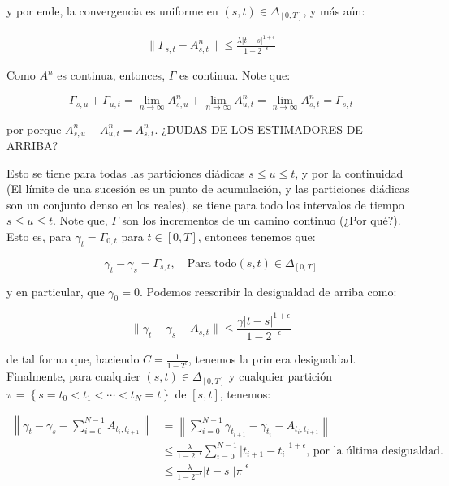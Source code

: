 y por ende, la convergencia es uniforme en $(s,t) \in \Delta_{[0,T]}$, y más aún:

\begin{align*}
	\lVert \Gamma_{s,t} - A^n_{s,t} \rVert \leq \frac{\lambda \lvert t - s \rvert^{1 + \epsilon}}{ 1 - 2^{ -\epsilon} }
\end{align*}

Como $A^n$ es continua, entonces, $\Gamma$ es continua. Note que:

\[
	\Gamma_{s,u} + \Gamma_{u,t} = \lim_{n \rightarrow \infty} A_{s,u}^n + \lim_{n \rightarrow \infty } A_{u,t}^n = \lim_{n \rightarrow \infty} A_{s,t}^n = \Gamma_{s,t}
\]

por porque $A_{s,u}^n + A_{u,t}^n = A_{s,t}^n$. ¿DUDAS DE LOS ESTIMADORES DE ARRIBA?

Esto se tiene para todas las particiones diádicas $s \leq u \leq t$, y por la continuidad (El límite de una sucesión es un punto de acumulación, y las particiones diádicas son un conjunto denso en los reales), se tiene para todo los intervalos de tiempo $s \leq u \leq t$. Note que, $\Gamma$ son los incrementos de un camino continuo (¿Por qué?). Esto es, para $\gamma_t = \Gamma_{0,t}$ para $t \in [0,T]$, entonces tenemos que:

\[
	\gamma_t - \gamma_s = \Gamma_{s,t}, \quad \text{Para todo} (s,t) \in \Delta_{[0,T]}
\]

y en particular, que $\gamma_0 = 0$. Podemos reescribir la desigualdad de arriba como:

\[
	\lVert \gamma_t - \gamma_s - A_{s,t} \rVert \leq \frac{ \gamma \lvert t - s \rvert^{ 1 + \epsilon } }{1 - 2^{-\epsilon}}
\]

de tal forma que, haciendo $C = \frac{1}{1 - 2^{\epsilon}}$, tenemos la primera desigualdad. Finalmente, para cualquier $(s,t) \in \Delta_{[0,T]}$ y cualquier partición $\pi = \left\{  s = t_0 < t_1 < \cdots < t_N = t \right\}$ de $[s,t]$, tenemos:

\begin{align*}
	\left \lVert \gamma_t - \gamma_s - \sum_{ i = 0 }^{N-1} A_{t_i, t_{i+1}} \right\rVert &= \left \lVert \sum_{i = 0}^{N - 1} \gamma_{t_{i+1}} - \gamma_{t_i} - A_{t_i, t_{i+1}} \right \rVert \\
	&\leq \frac{\lambda}{1 - 2^{-\epsilon}} \sum_{ i = 0 }^{N-1} \lvert t_{i+1} - t_i \rvert^{1 + \epsilon} \text{, por la última desigualdad.}\\
	&\leq \frac{\lambda}{1 - 2^{-\epsilon}} \lvert t - s \rvert \lvert \pi \rvert^{\epsilon}
\end{align*}

